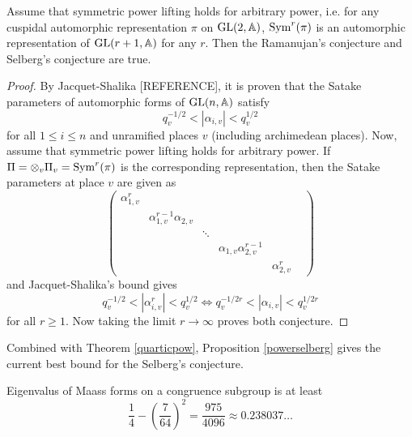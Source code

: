 \begin{proposition}
\label{powerselberg}
Assume that symmetric power lifting holds for arbitrary power, i.e. for any cuspidal automorphic representation $\pi$ on $\operatorname{\mathrm{GL}}(2,\mathbb{A})$,  $\mathrm{Sym}^{r}(\pi)$ is an automorphic representation of $\operatorname{\mathrm{GL}}(r + 1, \mathbb{A})$ for any $r$.
Then the Ramanujan's conjecture and Selberg's conjecture are true.
\end{proposition}
\begin{proof}
By Jacquet-Shalika [REFERENCE], it is proven that the Satake parameters of automorphic forms of $\operatorname{\mathrm{GL}}(n, \mathbb{A})$ satisfy 
$$
q_{v}^{-1/2} < |\alpha_{i,v}| < q_{v}^{1/2}
$$
for all $1\leq i\leq n$ and unramified places $v$ (including archimedean places).
Now, assume that symmetric power lifting holds for arbitrary power. 
If $\Pi = \otimes_{v}\Pi_{v} = \mathrm{Sym}^{r}(\pi)$ is the corresponding representation, then the Satake parameters at place $v$ are given as
$$
\begin{pmatrix}
\alpha_{1, v}^{r} & & & & \\ 
& \alpha_{1, v}^{r-1}\alpha_{2, v} & & & \\ 
& & \ddots & & & \\
& & & \alpha_{1, v}\alpha_{2, v}^{r-1} & \\
& & & & \alpha_{2, v}^{r}
\end{pmatrix}
$$
and Jacquet-Shalika's bound gives 
$$
q_{v}^{-1/2} < |\alpha_{i, v}^{r}| < q_{v}^{1/2} \Longleftrightarrow q_{v}^{-1/2r} < |\alpha_{i, v}| < q_{v}^{1/2r}
$$
for all $r\geq 1$. Now taking the limit $r\to \infty$ proves both conjecture.
\end{proof}

Combined with Theorem \ref{quarticpow}, Proposition \ref{powerselberg} gives the current best bound for the Selberg's conjecture.

\begin{corollary}
Eigenvalus of Maass forms on a congruence subgroup is at least 
$$
\frac{1}{4} - \left(\frac{7}{64}\right)^{2} = \frac{975}{4096} \approx 0.238037\dots
$$
\end{corollary}
